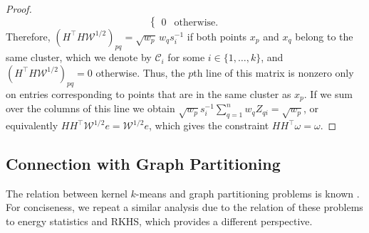 \documentclass[aps,preprint,nofootinbib,floatfix]{revtex4-1}
\newcommand\C{{\mathcal{C}}}
\newcommand\e{e}
\newcommand\om{\omega}
\begin{document}
\begin{proof}
\begin{equation}
\begin{cases}
0 & \mbox{otherwise}.
\end{cases}
\end{equation}
Therefore, $(H^\top H \mathcal{W}^{1/2})_{pq} = \sqrt{w_p} \, w_q s_i^{-1}$
if both points $x_p$ and $x_q$ belong to the same cluster, which
we denote by $\C_i$ for some $i\in\{1,\dotsc,k\}$, and 
$(H^\top H \mathcal{W}^{1/2})_{pq} = 0 $ otherwise. Thus, the $p$th
line of this matrix is nonzero only on entries corresponding to points
that are in the same cluster as $x_p$. If we sum over the columns of this
line we obtain $\sqrt{w_p} s_i^{-1} \sum_{q=1}^n w_q Z_{qi} = \sqrt{w_p}$,
or equivalently $H H^\top \mathcal{W}^{1/2} \e = \mathcal{W}^{1/2} \e$,
which gives the constraint $H H^\top \om = \om$.
\end{proof}


\subsection*{Connection with Graph Partitioning}

The relation between kernel $k$-means and graph partitioning problems
is known \cite{Dhillon2,Dhillon}. For conciseness, we repeat a similar 
analysis due to the relation of these problems to
energy statistics and RKHS, which  provides a different perspective.
\end{document}
